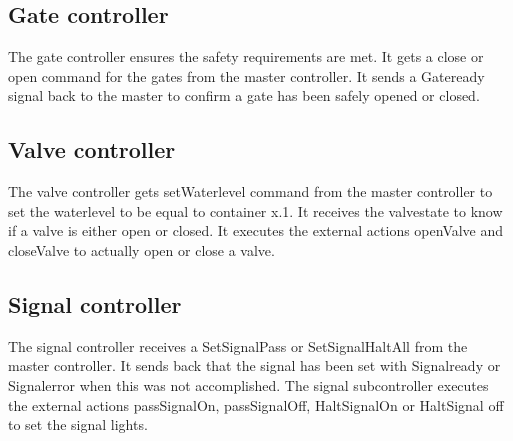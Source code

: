 \subsection{Gate controller}
The gate controller ensures the safety requirements are met. It gets a close or open command for the gates from the master controller. It sends a Gateready signal back to the master to confirm a gate has been safely opened or closed. 
\subsection{Valve controller}
The valve controller gets setWaterlevel command from the master controller to set the waterlevel to be equal to container x.1. It receives the valvestate to know if a valve is either open or closed. It executes the external actions openValve and closeValve to actually open or close a valve.  
\subsection{Signal controller}
The signal controller receives a SetSignalPass or SetSignalHaltAll from the master controller. It sends back that the signal has been set with Signalready or Signalerror when this was not accomplished. The signal subcontroller executes the external actions passSignalOn, passSignalOff, HaltSignalOn or HaltSignal off to set the signal lights. 
